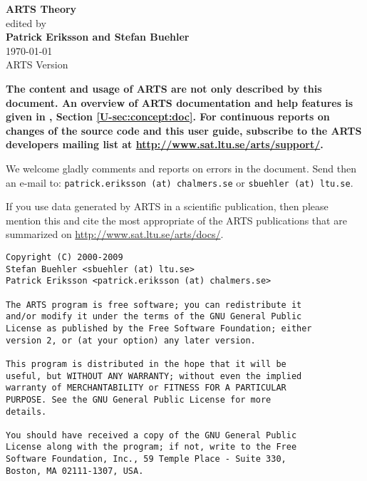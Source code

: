 \documentclass[11pt,twoside,a4paper,fleqn]{book}
\begin{document}
%
\renewcommand{\thepage}{title \arabic{page}} 

\thispagestyle{plain}
\begin{center}
  \vspace*{1cm}
  {\Huge \bf ARTS Theory\\}
  \vspace*{1cm}
  {\large edited by \\}
  \vspace*{1cm}
  {\Large \bf Patrick Eriksson and Stefan Buehler }\\
   \vspace*{2cm}
   {\large \today\\
    ARTS Version 
   }
\end{center}
\vspace*{\fill}
{\normalsize \bf
  \noindent
  The content and usage of ARTS are not only described by this
  document. An overview of ARTS documentation and help features is
  given in \user, Section \ref{U-sec:concept:doc}. For continuous reports on
  changes of the source code and this user guide, subscribe to the
  ARTS developers mailing list at \url{http://www.sat.ltu.se/arts/support/}.

  We welcome gladly comments and reports on errors in the document.
  Send then an e-mail to: \verb|patrick.eriksson (at) chalmers.se| or 
  \verb|sbuehler (at) ltu.se|.

  If you use data generated by ARTS in a scientific
  publication, then please mention this and cite the most
  appropriate of the ARTS publications that are summarized on
  \url{http://www.sat.ltu.se/arts/docs/}.
}

\newpage                          
\thispagestyle{empty}
\vspace*{\fill}
\noindent
\begin{lstlisting}
Copyright (C) 2000-2009
Stefan Buehler <sbuehler (at) ltu.se>
Patrick Eriksson <patrick.eriksson (at) chalmers.se>

The ARTS program is free software; you can redistribute it
and/or modify it under the terms of the GNU General Public
License as published by the Free Software Foundation; either
version 2, or (at your option) any later version.

This program is distributed in the hope that it will be
useful, but WITHOUT ANY WARRANTY; without even the implied
warranty of MERCHANTABILITY or FITNESS FOR A PARTICULAR
PURPOSE. See the GNU General Public License for more
details. 

You should have received a copy of the GNU General Public
License along with the program; if not, write to the Free
Software Foundation, Inc., 59 Temple Place - Suite 330,
Boston, MA 02111-1307, USA. 
\end{lstlisting}
\end{document}
